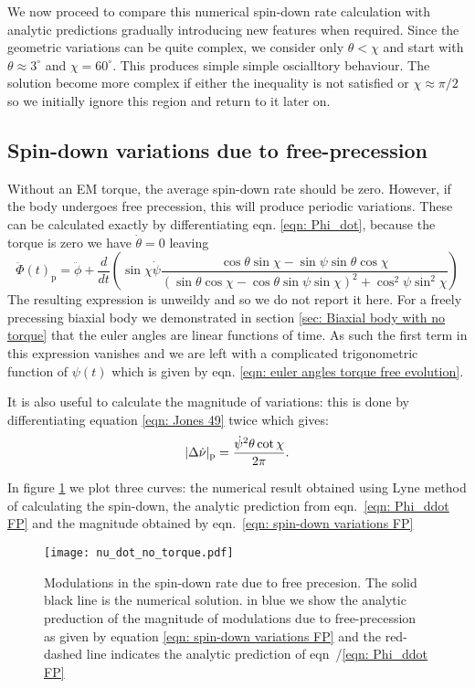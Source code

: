 \documentclass[/home/greg/Thesis/main/main.tex]{subfiles}
\begin{document}
We now proceed to compare this numerical spin-down rate calculation with analytic
predictions gradually introducing new features when required. Since the geometric
variations can be quite complex, we consider only $\theta < \chi$ and start 
with $\theta \approx 3^{\circ}$ and $\chi=60^{\circ}$. This produces simple
simple oscialltory behaviour. The solution become more complex if either
the inequality is not satisfied or $\chi \approx \pi/2$ so we initially
ignore this region and return to it later on.

\subsection{Spin-down variations due to free-precession}
Without an EM torque, the average spin-down rate should be zero. However, if
the body undergoes free precession, this will produce periodic variations. These
can be calculated exactly by differentiating eqn. \eqref{eqn: Phi_dot}, because
the torque is zero we have $\dot{\theta} = 0$ leaving
\begin{equation}
    \ddot{\Phi}(t)_{\mathrm{p}} = \ddot{\phi} + \frac{d}{dt}\left(
        \sin\chi\dot{\psi} \frac{\cos\theta\sin\chi - \sin \psi \sin \theta \cos\chi 
}{(\sin\theta \cos \chi - \cos \theta \sin \psi \sin \chi)^{2} + \cos^{2}\psi \sin^{2} \chi}
\right)
\label{eqn: Phi_ddot FP}
\end{equation}
The resulting expression is unweildy and so we do not report it here. For a 
freely precessing biaxial body we demonstrated in section \ref{sec: Biaxial body with no torque}
that the euler angles are linear functions of time. As such the first term 
in this expression vanishes and we are left with a complicated trigonometric
function of $\psi(t)$ which is given by eqn. \eqref{eqn: euler angles torque free evolution}.

It is also useful to calculate the magnitude of variations: this is done by
differentiating equation \eqref{eqn: Jones 49} twice which gives:
\begin{equation}
    |\Delta\dot{\nu}|_{\mathrm{p}} =\frac{\dot{\psi}^{2} \theta \cot\chi}{2\pi}. 
    \label{eqn: spin-down variations FP}
\end{equation}

In figure \ref{fig: nu_dot no torque} we plot three curves: the numerical
result obtained using Lyne method of calculating the spin-down, the analytic
prediction from eqn.~\eqref{eqn: Phi_ddot FP} and the magnitude obtained by
eqn.~\eqref{eqn: spin-down variations FP}
\begin{figure}[ht]
\centering
	\texttt{[image: nu\_dot\_no\_torque.pdf]}
\caption{Modulations in the spin-down rate due to free precesion. The solid black
         line is the numerical solution. in blue we show the analytic 
         preduction of the magnitude of modulations due to free-precession as
         given by equation \eqref{eqn: spin-down variations FP} and the red-dashed
         line indicates the analytic prediction of eqn~/\eqref{eqn: Phi_ddot FP}}
\label{fig: nu_dot no torque}
\end{figure}
\end{document}

